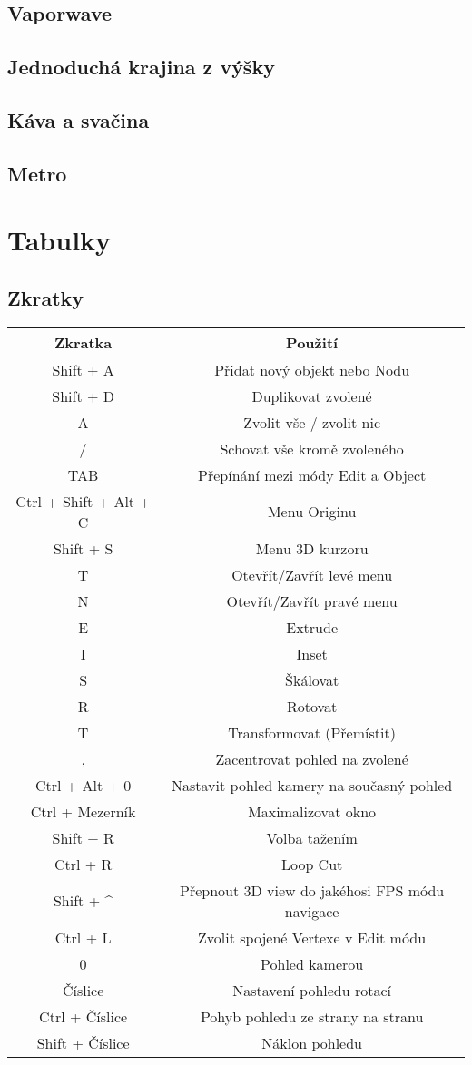 \documentclass[12pt,a4paper]{report}
\begin{document}
	\section{Vaporwave}
	\section{Jednoduchá krajina z výšky}
	\section{Káva a svačina}
	\section{Metro}
	
	\chapter{Tabulky}
	\section{Zkratky}
	\begin{tabular}{cc}
		\toprule
		Zkratka
& Použití
\\
		\midrule
		Shift + A  & Přidat nový objekt nebo Nodu
\\
		Shift + D & Duplikovat zvolené
\\
		A & Zvolit vše / zvolit nic
\\
		/ & Schovat vše kromě zvoleného
\\
		TAB & Přepínání mezi módy Edit a Object
\\
		Ctrl + Shift + Alt +
C & Menu Originu
\\
		Shift + S & Menu 3D kurzoru
\\
		T & Otevřít/Zavřít levé menu
\\
		N & Otevřít/Zavřít pravé menu
\\
		E & Extrude
\\
		I & Inset
\\
		S & Škálovat
\\
		R & Rotovat
\\
		T & Transformovat (Přemístit)
\\
		, & Zacentrovat pohled na zvolené
\\
		Ctrl + Alt + 0 & Nastavit pohled kamery na současný pohled
\\
		Ctrl + Mezerník & Maximalizovat okno
\\
		Shift + R & Volba tažením
\\
		Ctrl + R & Loop Cut
\\
		Shift + \^ & Přepnout 3D view do jakéhosi FPS módu navigace
\\
		Ctrl + L & Zvolit spojené Vertexe v Edit módu
\\
		0 & Pohled kamerou
\\
		Číslice & Nastavení pohledu rotací
\\
		Ctrl + Číslice & Pohyb pohledu ze strany na stranu
\\
		Shift + Číslice & Náklon pohledu
	\end{tabular}
	
\end{document}
